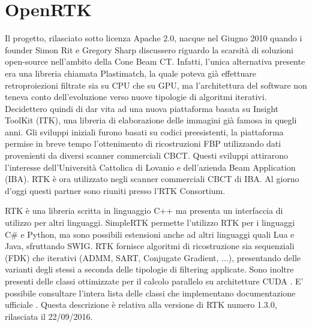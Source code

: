 \documentclass[a4paper,12pt, doubleside]{report}
\begin{document}
        \section{OpenRTK}
            \par
                Il progetto, rilasciato sotto licenza Apache 2.0, nacque nel Giugno 2010 quando i founder Simon Rit e Gregory Sharp discussero riguardo la scarsità di soluzioni open-source nell'ambito della Cone Beam CT. Infatti, l'unica alternativa presente era una libreria chiamata Plastimatch, la quale poteva già effettuare retroproiezioni filtrate sia su CPU che su GPU, ma l'architettura del software non teneva conto dell'evoluzione verso nuove tipologie di algoritmi iterativi. Decidettero quindi di dar vita ad una nuova piattaforma basata su Insight ToolKit (ITK), una libreria di elaborazione delle immagini già famosa in quegli anni. Gli sviluppi iniziali furono basati su codici preesistenti, la piattaforma permise in breve tempo l'ottenimento di ricostruzioni FBP utilizzando dati provenienti da diversi scanner commerciali CBCT. Questi sviluppi attirarono l'interesse dell'Università Cattolica di Lovanio e dell'azienda Beam Application (IBA). RTK è ora utilizzato negli scanner commerciali CBCT di IBA. Al giorno d'oggi questi partner sono riuniti presso l'RTK Consortium.
            
            \bigskip
            \par
                RTK è una libreria scritta in linguaggio C++ ma presenta un interfaccia di utilizzo per altri linguaggi. SimpleRTK\cite{simplertk-wiki} permette l'utilizzo RTK per i linguaggi C\# e Python, ma sono possibili estensioni anche ad altri linguaggi quali Lua e Java, sfruttando SWIG\cite{swig-website}.  RTK fornisce algoritmi di ricostruzione sia sequenziali (FDK) che iterativi (ADMM, SART, Conjugate Gradient, ...), presentando delle varianti degli stessi a seconda delle tipologie di filtering applicate. Sono inoltre presenti delle classi ottimizzate per il calcolo parallelo su architetture CUDA \cite{cuda}. E' possibile consultare l'intera lista delle classi che implementano documentazione ufficiale \cite{rtk-classi}. 
                Questa descrizione è relativa alla versione di RTK numero 1.3.0, rilasciata il 22/09/2016.
                    
\end{document}
